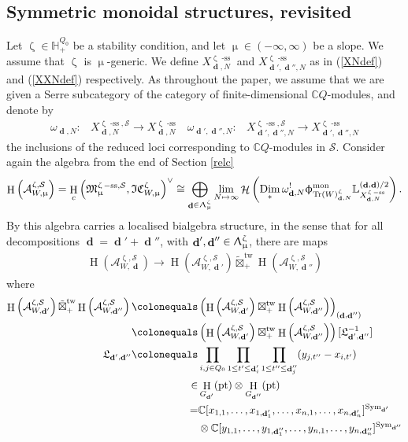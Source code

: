 \documentclass[a4paper,10pt]{amsart}
\renewcommand{\zeta}{\upzeta}
\renewcommand{\Lambda}{\Uplambda}
\renewcommand{\phi}{\upphi}
\renewcommand{\mu}{\upmu}
\newcommand{\LL}{\mathbb{L}}
\newcommand{\SP}{\mathcal{S}}
\newcommand{\W}{\mathrm{Tr}(W)}
\newcommand{\Mst}{\mathfrak{M}}
\newcommand{\ICSt}{\mathfrak{IC}}
\newcommand{\phim}[1]{\phi^{\mon}_{#1}}
\DeclareMathOperator{\sst}{-ss}
\DeclareMathOperator{\tw}{tw}
\DeclareMathOperator{\mon}{mon}
\DeclareMathOperator{\Dim}{\mathrm{Dim}}
\DeclareMathOperator{\dd}{\mathbf{d}}
\DeclareMathOperator{\Sym}{Sym}
\DeclareMathOperator{\pt}{pt}
\DeclareMathOperator{\Ho}{\mathcal{H}}
\DeclareMathOperator{\HO}{H}
\begin{document}
\subsection{Symmetric monoidal structures, revisited}
\label{lc_signs}
Let $\zeta\in \mathbb{H}_+^{Q_0}$ be a stability condition, and let $\mu\in(-\infty,\infty)$ be a slope.  We assume that $\zeta$ is $\mu$-generic.  We define $X^{\zeta\sst}_{\dd,N}$ and $X^{\zeta\sst}_{\dd',\dd'',N}$ as in (\ref{XNdef}) and (\ref{XXNdef}) respectively.  As throughout the paper, we assume that we are given a Serre subcategory of the category of finite-dimensional $\mathbb{C}Q$-modules, and denote by
\begin{align*}
\omega_{\dd,N}\colon &X^{\zeta\sst,\SP}_{\dd,N}\rightarrow X_{\dd,N}^{\zeta\sst}&
\omega_{\dd',\dd'',N}\colon & X^{\zeta\sst,\SP}_{\dd',\dd'',N}\rightarrow X_{\dd',\dd'',N}^{\zeta\sst}
\end{align*}
the inclusions of the reduced loci corresponding to $\mathbb{C}Q$-modules in $\SP$.  Consider again the algebra from the end of Section \ref{relc}
\[
\HO\left(\mathcal{A}_{W,\mu}^{\zeta,\SP}\right)=\HO_c\left(\Mst_{\mu}^{\zeta\sst,\SP},\ICSt_{W,\mu}^{\zeta}\right)^{\vee}\cong\bigoplus_{\dd\in\Lambda_{\mu}^{\zeta}}\lim_{N\mapsto\infty}\Ho\left(\Dim_*\omega^!_{\dd,N}\phim{\W_{\dd,N}^{\zeta}}\LL^{(\dd,\dd)/2}_{X_{\dd,N}^{\zeta\sst}}\right).
\]
By \cite[Thm.5.11]{Da13} this algebra carries a localised bialgebra structure, in the sense that for all decompositions $\dd=\dd'+\dd''$, with $\dd',\dd''\in\Lambda_{\mu}^{\zeta}$, there are maps
\begin{align}
\label{coprodint}
\HO\left(\mathcal{A}_{W,\dd}^{\zeta,\SP}\right)\rightarrow \HO\left(\mathcal{A}_{W,\dd'}^{\zeta,\SP}\right)\tilde{\boxtimes}_+^{\tw} \HO\left(\mathcal{A}_{W,\dd''}^{\zeta,\SP}\right)
\end{align}
where 
\begin{align*}
\HO\left(\mathcal{A}_{W,\dd'}^{\zeta,\SP}\right)\tilde{\boxtimes}_+^{\tw} \HO\left(\mathcal{A}_{W,\dd''}^{\zeta,\SP}\right)\colonequals &\left(\HO\left(\mathcal{A}_{W,\dd'}^{\zeta,\SP}\right)\boxtimes_+^{\tw} \HO\left(\mathcal{A}_{W,\dd''}^{\zeta,\SP}\right)\right)_{(\dd,\dd'')}\\
\colonequals &\left(\HO\left(\mathcal{A}_{W,\dd'}^{\zeta,\SP}\right)\boxtimes_+^{\tw} \HO\left(\mathcal{A}_{W,\dd''}^{\zeta,\SP}\right)\right)[\mathfrak{L}_{\dd',\dd''}^{-1}]\\
\mathfrak{L}_{\dd',\dd''}\colonequals &\prod_{i,j\in Q_0}\prod_{1\leq t'\leq \dd'_i}\prod_{1\leq t''\leq \dd''_j}(y_{j,t''}-x_{i,t'})\\
\in &\HO_{G_{\dd'}}(\pt)\otimes \HO_{G_{\dd''}}(\pt)\\
=&\mathbb{C}[x_{1,1},\ldots,x_{1,\dd'_1},\ldots,x_{n,1},\ldots,x_{n,\dd'_n}]^{\Sym_{\dd'}}\\&\otimes \mathbb{C}[y_{1,1},\ldots,y_{1,\dd''_1},\ldots,y_{n,1},\ldots,y_{n,\dd''_n}]^{\Sym_{\dd''}}
\end{align*}
\end{document}
